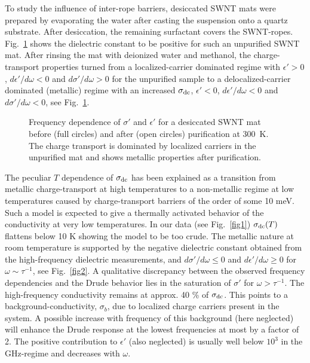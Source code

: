 \begin{multicols}{2}
To study the influence of inter-rope barriers, desiccated SWNT mats
were prepared by evaporating the water after casting the
suspension onto a quartz substrate. After desiccation, the remaining
surfactant covers the SWNT-ropes. Fig.~\ref{fig4} shows the
dielectric constant to be positive for such an unpurified SWNT mat.
After rinsing the mat with deionized water and methanol, the
charge-transport properties turned from a localized-carrier
dominated regime with $\epsilon' > 0$, $d\epsilon' / d\omega < 0$
and $d\sigma' / d\omega > 0$ for the unpurified sample to a
delocalized-carrier dominated (metallic) regime with an increased
$\sigma_{\rm dc}$, $\epsilon' < 0$, $d\epsilon' / d\omega < 0$ and
$d\sigma'/ d\omega < 0$, see Fig.~\ref{fig4}.
\begin{figure}[htb]
\begin{center}
\leavevmode
{}
\end{center}
\caption{Frequency dependence of $\sigma'$ and $\epsilon'$ for a desiccated SWNT mat before (full circles) and after (open circles) purification at 300~K. The charge transport is dominated by localized carriers in the unpurified mat and shows metallic properties after purification.}
\label{fig4}
\end{figure}

The peculiar $T$ dependence of $\sigma_{\rm dc}$ has been explained
as a transition from metallic charge-transport at high temperatures
to a non-metallic regime at low temperatures caused by
charge-transport barriers of the order of some 10 meV\cite{Kane97}. Such a
model is expected to give a thermally activated behavior of the conductivity
at very low temperatures. In our data (see Fig.~\ref{fig1})
$\sigma_{\rm dc}(T)$ flattens below 10 K showing the model to be too crude.
The metallic nature at room temperature is supported by the
negative dielectric constant obtained from the high-frequency
dielectric measurements, and $d\sigma'/d\omega \le 0$ and
$d\epsilon'/d\omega \ge 0$ for $\omega \sim \tau^{-1}$, see Fig.~\ref{fig2}.
A qualitative discrepancy between the observed frequency dependencies and the
Drude behavior lies in the saturation of
$\sigma'$ for $\omega >\tau^{- 1}$. The high-frequency
conductivity remains at approx. 40 \% of $\sigma_{\rm dc}$. This
points to a background-conductivity, $\sigma_b$, due to localized
charge carriers present in the system. A possible increase with frequency
of this background\cite{Reedijk98} (here neglected) will enhance the Drude
response at the lowest frequencies at most by a factor of 2. The positive
contribution to $\epsilon'$ (also neglected) is usually well below $10^3$ in
the GHz-regime and decreases with $\omega$.


\end{multicols}
